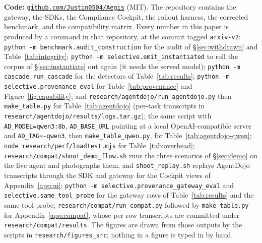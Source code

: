 \documentclass[sigconf,nonacm]{acmart}
\begin{document}
\medskip\noindent
\textbf{Code:}
\href{https://github.com/Justin0504/Aegis}{\texttt{github.com/\allowbreak Justin0504/\allowbreak Aegis}} (MIT).
The repository contains the gateway, the SDKs, the Compliance Cockpit,
the rollout harness, the corrected benchmark, and the compatibility
matrix. Every number in this paper is produced by a command in that
repository, at the commit tagged \texttt{arxiv-v2}:
\texttt{python -m benchmark.audit\_construction} for the audit of
\S\ref{sec:withdrawn} and Table~\ref{tab:integrity};
\texttt{python -m selective.emit\_instantiated} to roll the corpus of
\S\ref{sec:instantiate} out again (it needs the served model);
\texttt{python -m cascade.run\_cascade} for the detectors of
Table~\ref{tab:results}; \texttt{python -m selective.provenance\_eval}
for Table~\ref{tab:provenance} and Figure~\ref{fig:capability}; and
\texttt{research/agentdojo/run\_agentdojo.py} then
\texttt{make\_table.py} for Table~\ref{tab:agentdojo} (per-task
transcripts in \texttt{research/agentdojo/results/logs.tar.gz});
the same script with \texttt{AD\_MODEL=qwen3:8b}, \texttt{AD\_BASE\_URL}
pointing at a local OpenAI-compatible server and \texttt{AD\_TAG=-qwen3},
then \texttt{make\_table\_qwen.py}, for Table~\ref{tab:agentdojo-qwen};
\texttt{node research/perf/loadtest.mjs} for Table~\ref{tab:overhead};
\texttt{research/compat/shoot\_demo\_flow.sh} runs the three scenarios of
\S\ref{sec:demo} on the live agent and photographs them, and
\texttt{shoot\_replay.sh} replays AgentDojo transcripts through the SDK
and gateway for the Cockpit views of Appendix~\ref{app:ui};
\texttt{python -m selective.provenance\_gateway\_eval} and
\texttt{selective.same\_tool\_probe} for the gateway rows of
Table~\ref{tab:results} and the same-tool probe;
\texttt{research/compat/run\_compat.py} followed by
\texttt{make\_table.py} for Appendix~\ref{app:compat}, whose per-row
transcripts are committed under \texttt{research/compat/results}. The
figures are drawn from those outputs by the scripts in
\texttt{research/figures\_src}; nothing in a figure is typed in by hand.
\clearpage



\newpage
\appendix








\end{document}
